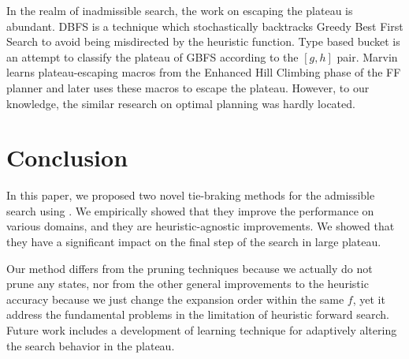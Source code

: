 In the realm of inadmissible search, the work on escaping the plateau is
abundant. DBFS \cite{imai2011novel} is a technique which stochastically
backtracks Greedy Best First Search to avoid being misdirected by the
heuristic function. Type based bucket \cite{xie14type} is an attempt to
classify the plateau of GBFS according to the $[g,h]$ pair.
Marvin \cite{Coles07} learns plateau-escaping macros from the Enhanced
Hill Climbing phase of the FF planner \cite{Hoffmann01} and later uses
these macros to escape the plateau.  However, to our knowledge, the
similar research on optimal planning was hardly located.

\section{Conclusion}

In this paper, we proposed two novel tie-braking methods for the admissible search using \astar. We empirically showed that they improve the performance on various domains, and they are heuristic-agnostic improvements. We showed that they have a significant impact on the final step of the search in large plateau.

Our method differs from the pruning techniques because we actually
do not prune any states, nor from the other general improvements to the
heuristic accuracy because we just change the expansion order within the
same $f$, yet it address the fundamental problems in the limitation of
heuristic forward search.  Future work includes a development of learning
technique for adaptively altering the search behavior in the plateau.




